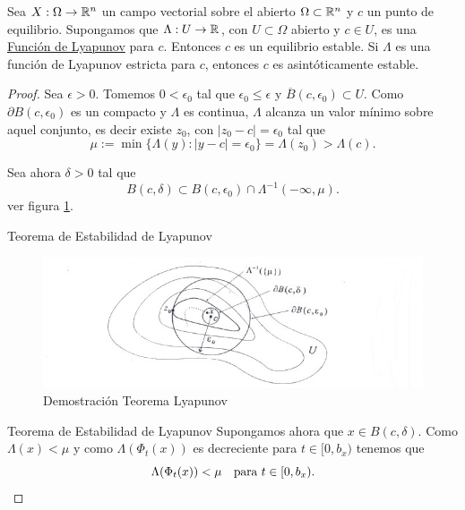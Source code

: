 \begin{teorema}{}
  Sea $X:\Omega\to\mathbb{R}^n$ un campo vectorial sobre el abierto $\Omega\subset\mathbb{R}^n$ y $c$ un punto de equilibrio.
               Supongamos que $\Lambda:U\to\mathbb{R}$, con $U\subset\Omega$ abierto y $c\in U$, es una
               \href{http://es.wikipedia.org/wiki/Función_de_Lyapunov}{Función de Lyapunov} para $c$. Entonces $c$ 
               es un equilibrio estable. Si $\Lambda$ es una función de Lyapunov estricta para $c$, entonces $c$ es 
               asintóticamente estable.
 \end{teorema}

\begin{proof}  Sea $\epsilon>0$. Tomemos $0<\epsilon_0$ tal que $\epsilon_0\leq\epsilon$ y 
$\overline{B}(c,\epsilon_0)\subset U$.  Como $\partial B(c,\epsilon_0)$ es un compacto y $\Lambda$ es continua, $\Lambda$
alcanza un valor mínimo sobre aquel conjunto, es decir existe $z_0$, con $|z_0-c|=\epsilon_0$ tal que
\begin{equation}\label{minimo}
 \mu:=\min\{\Lambda(y):|y-c|=\epsilon_0\}=\Lambda(z_0)>\Lambda(c).
\end{equation}

 Sea ahora $\delta>0$ tal que 
\[B(c,\delta)\subset B(c,\epsilon_0)\cap \Lambda^{-1}(-\infty,\mu).\]
ver figura \ref{dem_lya}.



 {Teorema de Estabilidad  de Lyapunov}
  \begin{figure}[h]
    \begin{center}
   \includegraphics[scale=0.5]{imagenes/dem_lya.jpg}
   \caption{Demostración Teorema Lyapunov}\label{dem_lya}
   \end{center}
 \end{figure}


{Teorema de Estabilidad  de Lyapunov}
  Supongamos ahora que $x\in B(c,\delta)$. Como $\Lambda(x)<\mu$ y como $\Lambda\left(\Phi_t(x)\right)$ es decreciente para 
 $t\in [0,b_x)$ tenemos que 
 \begin{equation}\label{decrec}
  \Lambda(\Phi_t(x))<\mu\quad\hbox{para } t\in [0,b_x).
 \end{equation}


\end{proof}

